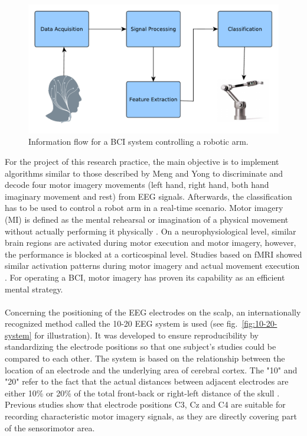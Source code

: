\documentclass[a4paper,twoside, openright,12pt]{report}
\begin{document}
\begin{figure}[htbp]
	\centering
	\includegraphics[width=0.8\linewidth]{./gfx/BCI_control_system.pdf}
	\caption{Information flow for a BCI system controlling a robotic arm.}
	\label{fig:bci_control_system}
\end{figure}
For the project of this research practice, the main objective is to implement algorithms similar to those described by Meng and Yong \cite{meng2016noninvasive,yong2015eeg} to discriminate and decode four motor imagery movements (left hand, right hand, both hand imaginary movement and
rest) from EEG signals. Afterwards, the classification has to be used to control a robot arm in a real-time scenario. Motor imagery (MI) is defined as the mental rehearsal or imagination of a physical movement without actually performing it physically \cite{decety1996neurophysiological}. On a neurophysiological level, similar brain regions are activated during motor execution and motor imagery, however, the performance is blocked at a corticospinal level. Studies based on fMRI showed similar activation patterns during motor imagery and actual movement execution \cite{lotze1999activation}. For operating a BCI, motor imagery has proven its capability as an efficient mental strategy. \\\\
Concerning the positioning of the EEG electrodes on the scalp, an internationally recognized method called the 10-20 EEG system is used (see fig.~\ref{fig:10-20-system} for illustration). It was developed to ensure reproducibility by standardizing the electrode positions so that one subject's studies could be compared to each other. The system is based on the relationship between the location of an electrode and the underlying area of cerebral cortex. The "10" and "20" refer to the fact that the actual distances between adjacent electrodes are either 10\% or 20\% of the total front-back or right-left distance of the skull \cite{homan1987cerebral}. Previous studies show that electrode positions C3, Cz and C4 are suitable for recording characteristic motor imagery signals, as they are directly covering part of the sensorimotor area. \\
\end{document}
